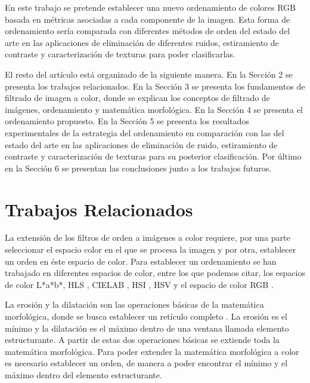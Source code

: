 En este trabajo se pretende establecer una nuevo ordenamiento de colores RGB basada en m\'etricas asociadas a cada  componente de la imagen.  Esta forma de ordenamiento ser\'ia comparada con diferentes m\'etodos de orden del estado del arte en las aplicaciones de eliminaci\'on de diferentes ruidos, estiramiento de contraste y caracterización de texturas para poder clasificarlas. 

El resto del art\'iculo est\'a organizado de la siguiente manera. En la Secci\'on 2 se presenta los trabajos relacionados. En la Secci\'on 3 se presenta los fundamentos de filtrado de imagen a color, donde se explican	los conceptos de filtrado de im\'agenes, ordenamiento y matem\'atica morfol\'ogica. En la Secci\'on 4 se presenta el  ordenamiento propuesto. En la Secci\'on 5 se presenta los resultados experimentales de la estrategia del ordenamiento en comparaci\'on con las del estado del arte en las aplicaciones de  eliminaci\'on de ruido, estiramiento de contraste y caracterización de texturas para su posterior clasificaci\'on. Por \'ultimo en la Secci\'on 6 se presentan las conclusiones junto a los trabajos futuros.

\section{Trabajos Relacionados}
\label{Relacionados}
La extensi\'on de los filtros de orden a im\'agenes a color requiere, por una parte seleccionar el espacio color en el que se procesa la imagen y por otra, establecer un orden en \'este espacio de color. Para establecer un ordenamiento se han trabajado en diferentes espacios de color, entre los que podemos citar, los espacios de color L*a*b*\cite{hanbury2001mathematical}, HLS \cite{hanbury2001mathematical2},  CIELAB \cite{hanbury2002mathematical3}, HSI \cite{tobar2007mathematical}, HSV \cite{lei2013vector} y el espacio de color RGB  \cite{zaharescu2003color, gao2013adaptive, wang2012edge}.

La erosi\'on y la dilataci\'on son las operaciones b\'asicas de la matem\'atica morfol\'ogica, donde se busca establecer un ret\'iculo completo \cite{heijmans1990algebraic}. La erosi\'on es el m\'inimo y la dilataci\'on es el m\'aximo dentro de una ventana llamada elemento estructurante. A partir de estas dos operaciones b\'asicas se extiende toda la matem\'atica morfol\'ogica.  Para poder extender la matem\'atica morfol\'ogica a color es necesario establecer un orden, de manera a poder encontrar el m\'inimo y el m\'aximo dentro del elemento estructurante. 


